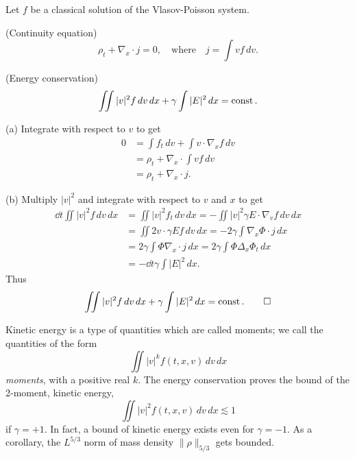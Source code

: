 \documentclass[12pt]{article}
\begin{document}
\begin{lem}
Let $f$ be a classical solution of the Vlasov-Poisson system.
\begin{parts}
\item(Continuity equation)
\[\rho_t+\nabla_x\cdot j=0,\quad\text{where}\quad j=\int vf\,dv.\]
\item(Energy conservation)
\[\iint|v|^2f\,dv\,dx+\gamma\int|E|^2\,dx=\operatorname{const}.\]
\end{parts}
\end{lem}
\begin{pf}
(a)
Integrate with respect to $v$ to get
\begin{align*}
0&=\int f_t\,dv+\int v\cdot\nabla_xf\,dv\\
&=\rho_t+\nabla_x\cdot\int vf\,dv\\
&=\rho_t+\nabla_x\cdot j.
\end{align*}

(b)
Multiply $|v|^2$ and integrate with respect to $v$ and $x$ to get
\begin{align*}
\dd{t}\iint|v|^2f\,dv\,dx
&=\iint|v|^2f_t\,dv\,dx=-\iint|v|^2\gamma E\cdot\nabla_vf\,dv\,dx\\
&=\iint2v\cdot\gamma Ef\,dv\,dx=-2\gamma\int\nabla_x\Phi\cdot j\,dx\\
&=2\gamma\int\Phi\nabla_x\cdot j\,dx=2\gamma\int\Phi\Delta_x\Phi_t\,dx\\
&=-\dd{t}\gamma\int|E|^2\,dx.
\end{align*}
Thus
\[\iint|v|^2f\,dv\,dx+\gamma\int|E|^2\,dx=\operatorname{const}.\qedhere\]
\end{pf}

Kinetic energy is a type of quantities which are called moments;
we call the quantities of the form
\[\iint|v|^kf(t,x,v)\,dv\,dx\]
\emph{moments}, with a positive real $k$.
The energy conservation proves the bound of the 2-moment, kinetic energy,
\[\iint|v|^2f(t,x,v)\,dv\,dx\lesssim1\]
if $\gamma=+1$.
In fact, a bound of kinetic energy exists even for $\gamma=-1$.
As a corollary, the $L^{5/3}$ norm of mass density $\|\rho\|_{5/3}$ gets bounded.
\end{document}
